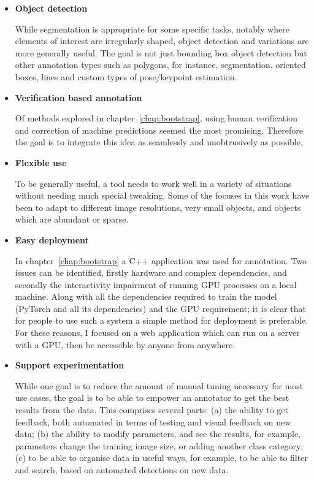 \begin{itemize}

\item {\bf Object detection} \par
While segmentation is appropriate for some specific tasks, notably where elements of interest are irregularly shaped, object detection and variations are more generally useful. The goal is not just bounding box object detection but other annotation types such as polygons, for instance, segmentation, oriented boxes, lines and custom types of pose/keypoint estimation.

\item {\bf Verification based annotation} \par
Of methods explored in chapter~\ref{chap:bootstrap}, using human verification and correction of machine predictions seemed the most promising. Therefore the goal is to integrate this idea as seamlessly and unobtrusively as possible, 

\item {\bf Flexible use} \par
To be generally useful, a tool needs to work well in a variety of situations without needing much special tweaking. Some of the focuses in this work have been to adapt to different image resolutions, very small objects, and objects which are abundant or sparse. 

\item {\bf Easy deployment} \par
In chapter~\ref{chap:bootstrap} a C++ application was used for annotation. Two issues can be identified, firstly hardware and complex dependencies, and secondly the interactivity impairment of running GPU processes on a local machine. Along with all the dependencies required to train the model (PyTorch \cite{Paszke2017} and all its dependencies) and the \gls{GPU} requirement; it is clear that for people to use such a system a simple method for deployment is preferable. For these reasons, I focused on a web application which can run on a server with a GPU, then be accessible by anyone from anywhere.

\item {\bf Support experimentation} \par
While one goal is to reduce the amount of manual tuning necessary for most use cases, the goal is to be able to empower an annotator to get the best results from the data. This comprises  several parts: (a) the ability to get feedback, both automated in terms of testing and visual feedback on new data; (b) the ability to modify parameters, and see the results, for example, parameters change the training image size, or adding another class category; (c) to be able to organise data in useful ways, for example, to be able to filter and search, based on automated detections on new data.

\end{itemize}


